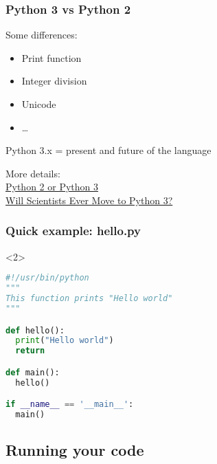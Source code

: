 \begin{frame}[fragile]
\frametitle{Python 3 vs Python 2}

Some differences:
\begin{itemize}
\item Print function
\item Integer division
\item Unicode
\item \ldots
\end{itemize}

Python 3.x = present and future of the language

\vfill

More details:\\
\href{https://wiki.python.org/moin/Python2orPython3}{Python 2 or Python 3}\\
\href{https://jakevdp.github.io/blog/2013/01/03/will-scientists-ever-move-to-python-3/}{Will Scientists Ever Move to Python 3?}

\end{frame}


\begin{frame}[t, fragile]
\frametitle{Quick example: hello.py}

{\huge
\faLaptop
}


\begin{onlyenv}<2>
\begin{lstlisting}[language=python]
#!/usr/bin/python
"""
This function prints "Hello world"
"""

def hello():
  print("Hello world")
  return

def main():
  hello()

if __name__ == '__main__':
  main()
\end{lstlisting}
\end{onlyenv}

\end{frame}

\subsection{Running your code}

